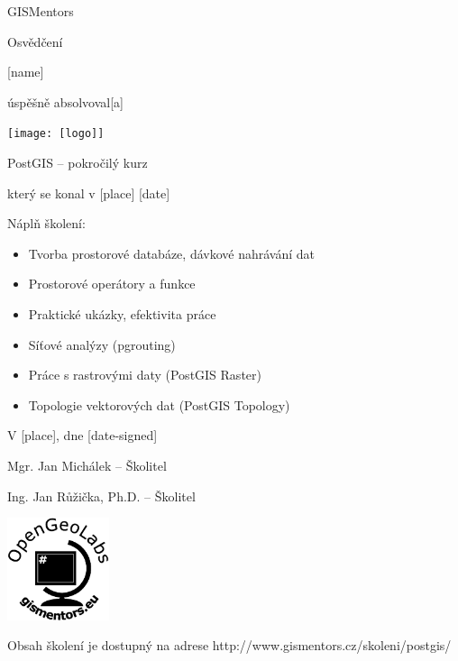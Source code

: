 \documentclass[12pt, a4paper]{letter}
\begin{document}
\pagestyle{empty}
\begin{center}

{\Large GISMentors}

{\Huge Osvědčení}

{\Large [name]}

úspěšně absolvoval[a]

\texttt{[image: [logo]]}

{\Large PostGIS -- pokročilý kurz}

který se konal v [place] [date]
\end{center}

Náplň školení:

\begin{itemize}
\item Tvorba prostorové databáze, dávkové nahrávání dat
\item Prostorové operátory a funkce
\item Praktické ukázky, efektivita práce
\item Síťové analýzy (pgrouting)
\item Práce s rastrovými daty (PostGIS Raster)
\item Topologie vektorových dat (PostGIS Topology)
\end{itemize}

\vfill
\parbox{7cm}{

    V [place], dne [date-signed]\\

\vfill

    Mgr. Jan Michálek -- Školitel\\

\vfill
    
    Ing. Jan Růžička, Ph.D. -- Školitel

}
\hfill
\parbox{3cm}{
    \includegraphics[width=3cm]{../images/placka.eps}
}


\begin{center}
{\footnotesize Obsah školení je dostupný na adrese
http://www.gismentors.cz/skoleni/postgis/}
\end{center}
\end{document}
